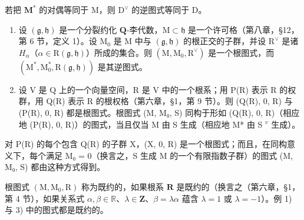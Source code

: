 若把 \(\mathbf{M}^*\) 的对偶等同于 M，则 \(\mathrm{D}^{\vee}\) 的逆图式等同于 D。

\begin{enumerate}
\def\labelenumi{\arabic{enumi})}
\setcounter{enumi}{2}
\item
  设 \((\mathfrak{g},\mathfrak{h})\) 是一个分裂约化 \(\mathbf{Q}\)-李代数，\(\mathrm{M} \subset \mathfrak{h}\) 是一个许可格（第八章，§12，第 6 节，定义 1）。设 \(\mathrm{M}_0\) 是 M 中与 \((\mathfrak{g},\mathfrak{h})\) 的根正交的子群，并设 \(\mathrm{R}^\vee\) 是诸 \(H_{\alpha}\)（\(\alpha \in \mathrm{R}(\mathfrak{g},\mathfrak{h})\)）所成的集合。则 \((\mathrm{M},\mathrm{M}_0,\mathrm{R}^\vee)\) 是一个根图式，而 \((\mathrm{M}^*,\mathrm{M}_0^*,\mathrm{R}(\mathfrak{g},\mathfrak{h}))\) 是其逆图式。
\item
  设 V 是 Q 上的一个向量空间，R 是 V 中的一个根系；用 P(R) 表示 R 的权群，用 Q(R) 表示 R 的根权格（第六章，§1，第 9 节）。则 (Q(R), 0, R) 与 (P(R), 0, R) 都是根图式。根图式 (M, M₀, S) 同构于形如 (Q(R), 0, R)（相应地 (P(R), 0, R)）的图式，当且仅当 M 由 S 生成（相应地 M* 由 S \(^{v}\) 生成）。
\end{enumerate}

对 P(R) 的每个包含 Q(R) 的子群 X，(X, 0, R) 是一个根图式；而且，在同构意义下，每个满足 M₀ = 0（换言之，S 生成 M 的一个有限指数子群）的图式 (M, M₀, S) 都由这种方式得到。

根图式 \((\mathrm{M},\mathrm{M}_0,\mathrm{R})\) 称为既约的，如果根系 \(\mathbf{R}\) 是既约的（换言之（第六章，§1，第 4 节），如果关系式 \(\alpha ,\beta \in \mathbb{R}\)、\(\lambda \in \mathbf{Z}\)、\(\beta = \lambda \alpha\) 蕴含 \(\lambda = 1\) 或 \(\lambda = -1\)）。例 1) 与 3) 中的图式都是既约的。

